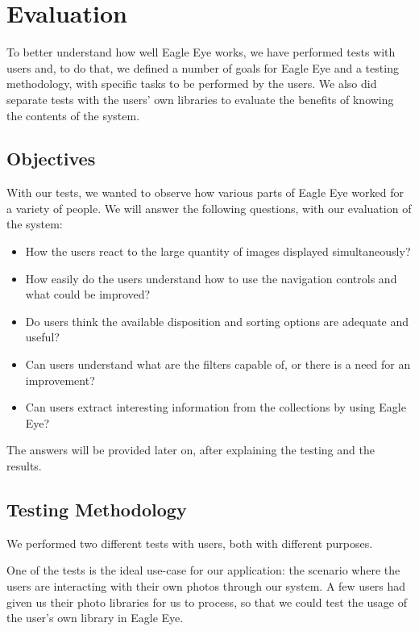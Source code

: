\chapter{Evaluation} %
\label{chapter:evaluation}


To better understand how well Eagle Eye works, we have performed tests with users and, to do that, we defined a number of goals for Eagle Eye and a testing methodology, with specific tasks to be performed by the users. We also did separate tests with the users' own libraries to evaluate the benefits of knowing the contents of the system.


\section{Objectives}

With our tests, we wanted to observe how various parts of Eagle Eye worked for a variety of people. 
We will answer the following questions, with our evaluation of the system:

\begin{itemize}
\item How the users react to the large quantity of images displayed simultaneously?
\item How easily do the users understand how to use the navigation controls and what could be improved?
\item Do users think the available disposition and sorting options are adequate and useful?
\item Can users understand what are the filters capable of, or there is a need for an improvement?
\item Can users extract interesting information from the collections by using Eagle Eye?
\end{itemize}

The answers will be provided later on, after explaining the testing and the results.

\section{Testing Methodology}

We performed two different tests with users, both with different purposes.

One of the tests is the ideal use-case for our application: the scenario where the users are interacting with their own photos through our system. A few users had given us their photo libraries for us to process, so that we could test the usage of the user's own library in Eagle Eye.

